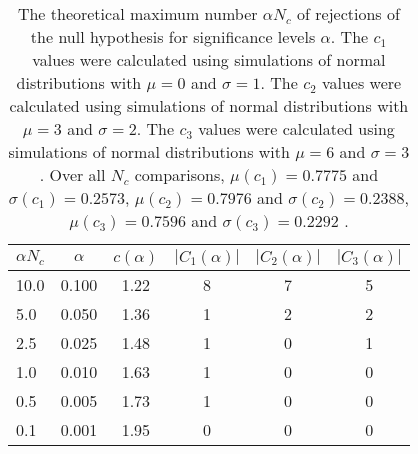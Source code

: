 \begin{table}[h!]
\begin{center}
\begin{tabular}{| l | c | c | c | c | c |}\hline
$\alpha N_c$ & $\alpha$ & $c(\alpha)$ & $|C_1(\alpha)|$ & $|C_2(\alpha)|$ & $|C_3(\alpha)|$ \\\hline\hline
10.0 & 0.100 & 1.22 & 8 & 7 & 5 \\\hline
5.0 & 0.050 & 1.36 & 1 & 2 & 2 \\\hline
2.5 & 0.025 & 1.48 & 1 & 0 & 1 \\\hline
1.0 & 0.010 & 1.63 & 1 & 0 & 0 \\\hline
0.5 & 0.005 & 1.73 & 1 & 0 & 0 \\\hline
0.1 & 0.001 & 1.95 & 0 & 0 & 0 \\\hline
\end{tabular}
\caption{The theoretical maximum number $\alpha N_c$ of rejections
        of the null hypothesis for significance levels $\alpha$.
        The $c_1$ values were calculated using simulations of normal distributions with $\mu=0$ and $\sigma=1$.
        The $c_2$ values were calculated using simulations of normal distributions with $\mu=3$ and $\sigma=2$.
        The $c_3$ values were calculated using simulations of normal distributions with $\mu=6$ and $\sigma=3$.
        Over all $N_c$ comparisons,
         $\mu(c_1)=0.7775$ and $\sigma(c_1)=0.2573$,
         $\mu(c_2)=0.7976$ and $\sigma(c_2)=0.2388$,
         $\mu(c_3)=0.7596$ and $\sigma(c_3)=0.2292$ .
        }
\end{center}
\end{table}